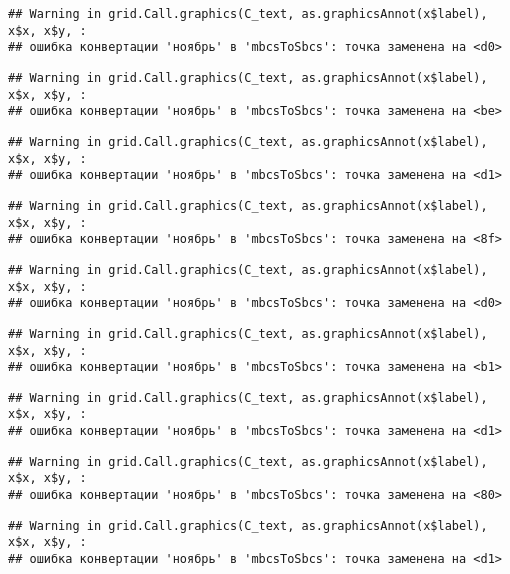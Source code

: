 \documentclass[
]{article}
\begin{document}
\begin{verbatim}
## Warning in grid.Call.graphics(C_text, as.graphicsAnnot(x$label), x$x, x$y, :
## ошибка конвертации 'ноябрь' в 'mbcsToSbcs': точка заменена на <d0>
\end{verbatim}

\begin{verbatim}
## Warning in grid.Call.graphics(C_text, as.graphicsAnnot(x$label), x$x, x$y, :
## ошибка конвертации 'ноябрь' в 'mbcsToSbcs': точка заменена на <be>
\end{verbatim}

\begin{verbatim}
## Warning in grid.Call.graphics(C_text, as.graphicsAnnot(x$label), x$x, x$y, :
## ошибка конвертации 'ноябрь' в 'mbcsToSbcs': точка заменена на <d1>
\end{verbatim}

\begin{verbatim}
## Warning in grid.Call.graphics(C_text, as.graphicsAnnot(x$label), x$x, x$y, :
## ошибка конвертации 'ноябрь' в 'mbcsToSbcs': точка заменена на <8f>
\end{verbatim}

\begin{verbatim}
## Warning in grid.Call.graphics(C_text, as.graphicsAnnot(x$label), x$x, x$y, :
## ошибка конвертации 'ноябрь' в 'mbcsToSbcs': точка заменена на <d0>
\end{verbatim}

\begin{verbatim}
## Warning in grid.Call.graphics(C_text, as.graphicsAnnot(x$label), x$x, x$y, :
## ошибка конвертации 'ноябрь' в 'mbcsToSbcs': точка заменена на <b1>
\end{verbatim}

\begin{verbatim}
## Warning in grid.Call.graphics(C_text, as.graphicsAnnot(x$label), x$x, x$y, :
## ошибка конвертации 'ноябрь' в 'mbcsToSbcs': точка заменена на <d1>
\end{verbatim}

\begin{verbatim}
## Warning in grid.Call.graphics(C_text, as.graphicsAnnot(x$label), x$x, x$y, :
## ошибка конвертации 'ноябрь' в 'mbcsToSbcs': точка заменена на <80>
\end{verbatim}

\begin{verbatim}
## Warning in grid.Call.graphics(C_text, as.graphicsAnnot(x$label), x$x, x$y, :
## ошибка конвертации 'ноябрь' в 'mbcsToSbcs': точка заменена на <d1>
\end{verbatim}
\end{document}
